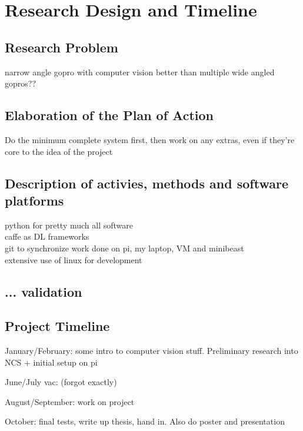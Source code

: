 \chapter{Research Design and Timeline}
\section{Research Problem}
narrow angle gopro with computer vision better than multiple wide angled gopros??

\section{Elaboration of the Plan of Action}
Do the minimum complete system first, then work on any extras, even if they're core to the idea of the project


\section{Description of activies, methods and software platforms}
python for pretty much all software \\
caffe as DL frameworks \\
git to synchronize work done on pi, my laptop, VM and minibeast \\
extensive use of linux for development



\section{... validation}



\section{Project Timeline}
January/February: some intro to computer vision stuff. Preliminary research into NCS + initial setup on pi

June/July vac: (forgot exactly)

August/September: work on project

October: final tests, write up thesis, hand in. Also do poster and presentation

